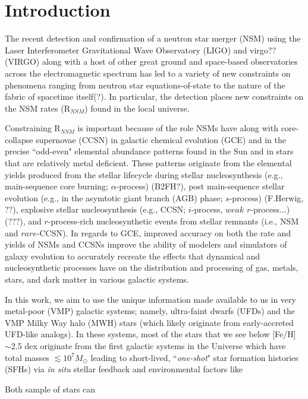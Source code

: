 \section{Introduction}
\label{intro} 
The recent detection and confirmation of a neutron star merger (NSM) using the Laser Interferometer Gravitational Wave Observatory (LIGO) and virgo?? (VIRGO) along with a host of other great ground and space-based observatories across the electromagnetic spectrum has led to a variety of new constraints on phenomena ranging from neutron star equations-of-state to the nature of the fabric of spacetime itself(?). In particular, the detection places new constraints on the NSM rates (R$_{NSM}$) found in the local universe. 

Constraining R$_{NSM}$ is important because of the role NSMs have along with core-collapse supernovae (CCSN) in galactic chemical evolution (GCE) and in the precise ``odd-even" elemental abundance patterns found in the Sun and in stars that are relatively metal deficient. These patterns originate from the elemental yields produced from the stellar lifecycle during stellar nucleosynthesis (e.g., main-sequence core burning; $\alpha$-process) (B2FH?), post main-sequence stellar evolution (e.g., in the asymtotic giant branch (AGB) phase; $s$-process) (F.Herwig, ??), explosive stellar nucleosynthesis (e.g., CCSN; $i$-process, $weak$ $r$-process...) (???), and $r$-process-rich nucleosynthetic events from stellar remnants (i.e., NSM and $rare$-CCSN). In regards to GCE, improved accuracy on both the rate and yields of NSMs and CCSNs improve the ability of modelers and simulators of galaxy evolution to accurately recreate the effects that dynamical and nucleosynthetic processes have on the distribution and processing of gas, metals, stars, and dark matter in various galactic systems.

In this work, we aim to use the unique information made available to us in very metal-poor (VMP) galactic systems; namely, ultra-faint dwarfs (UFDs) and the VMP Milky Way halo (MWH) stars (which likely originate from early-accreted UFD-like analogs). In these systems, most of the stars that we see below [Fe/H] $\sim$2.5 dex originate from the first galactic systems in the Universe which have total masses $\lesssim10^7 M_\odot$ leading to short-lived, ``{\it one-shot}" star formation histories (SFHs) via {\it in situ} stellar feedback and environmental factors like 

Both sample of stars can 